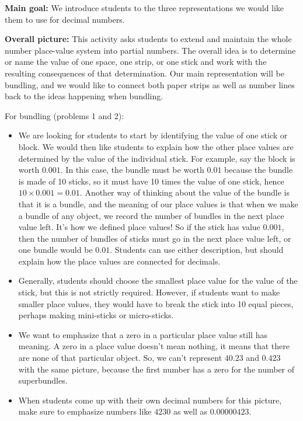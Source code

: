 \documentclass{ximera}
\begin{document}
\begin{instructorNotes}

{\bf Main goal:} We introduce students to the three representations we would like them to use for decimal numbers. 

{\bf Overall picture:}
    This activity asks students to extend and maintain the whole number place-value system into partial numbers.  The overall idea is to determine or name the value of one space, one strip, or one stick and work with the resulting consequences of that determination. Our main representation will be bundling, and we would like to connect both paper strips as well as number lines back to the ideas happening when bundling.
    
    For bundling (problems 1 and 2):
    \begin{itemize}
    	\item We are looking for students to start by identifying the value of one stick or block. We would then like students to explain how the other place values are determined by the value of the individual stick. For example, say the block is worth $0.001$. In this case, the bundle must be worth $0.01$ because the bundle is made of 10 sticks, so it must have 10 times the value of one stick, hence $10 \times 0.001 = 0.01$. Another way of thinking about the value of the bundle is that it is a bundle, and the meaning of our place values is that when we make a bundle of any object, we record the number of bundles in the next place value left. It's how we defined place values! So if the stick has value $0.001$, then the number of bundles of sticks must go in the next place value left, or one bundle would be $0.01$. Students can use either description, but should explain how the place values are connected for decimals.
	\item Generally, students should choose the smallest place value for the value of the stick, but this is not strictly required. However, if students want to make smaller place values, they would have to break the stick into 10 equal pieces, perhaps making mini-sticks or micro-sticks.
	\item We want to emphasize that a zero in a particular place value still has meaning. A zero in a place value doesn't mean nothing, it means that there are none of that particular object. So, we can't represent $40.23$ and $0.423$ with the same picture, because the first number has a zero for the number of superbundles.
	\item When students come up with their own decimal numbers for this picture, make sure to emphasize numbers like $4230$ as well as $0.00000423$.

\end{itemize}
\end{instructorNotes}
\end{document}
